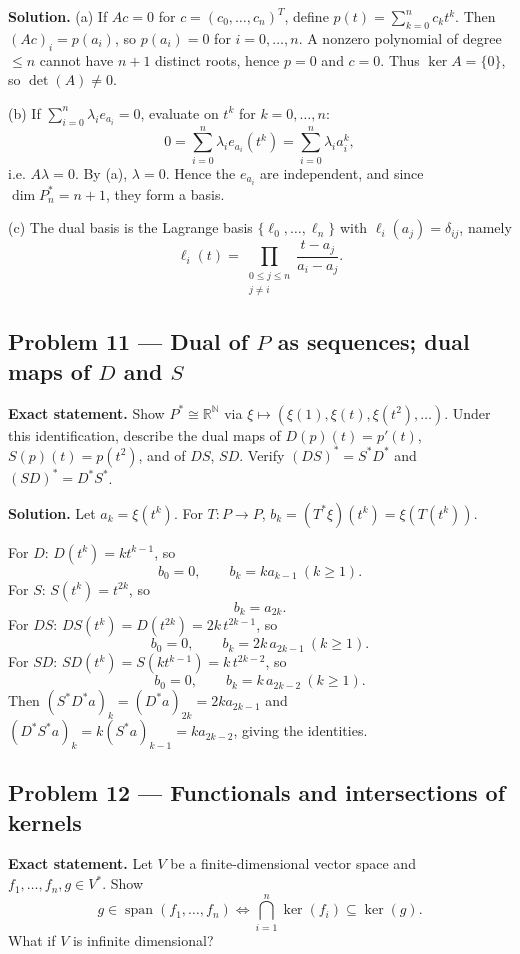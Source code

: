 \documentclass[12pt,a4paper]{article}
\theoremstyle{plain}
\theoremstyle{definition}      %
\begin{document}
\textbf{Solution.}
(a) If \(Ac=0\) for \(c=(c_0,\dots,c_n)^T\), define \(p(t)=\sum_{k=0}^n c_k t^k\). Then \((Ac)_i=p(a_i)\), so \(p(a_i)=0\) for
\(i=0,\dots,n\). A nonzero polynomial of degree \(\le n\) cannot have \(n+1\) distinct roots, hence \(p=0\) and \(c=0\).
Thus \(\ker A=\{0\}\), so \(\det(A)\neq0\).

(b) If \(\sum_{i=0}^n \lambda_i e_{a_i}=0\), evaluate on \(t^k\) for \(k=0,\dots,n\):
\[
0=\sum_{i=0}^n \lambda_i e_{a_i}(t^k)=\sum_{i=0}^n \lambda_i a_i^k,
\]
i.e. \(A\lambda=0\). By (a), \(\lambda=0\). Hence the \(e_{a_i}\) are independent, and since \(\dim P_n^*=n+1\), they form a basis.

(c) The dual basis is the Lagrange basis \(\{\ell_0,\dots,\ell_n\}\) with \(\ell_i(a_j)=\delta_{ij}\), namely
\[
\ell_i(t)=\prod_{\substack{0\le j\le n\\ j\ne i}}\frac{t-a_j}{a_i-a_j}.
\]

\subsection*{Problem 11 — Dual of \(P\) as sequences; dual maps of \(D\) and \(S\)}

\textbf{Exact statement.}
Show \(P^*\cong\mathbb R^{\mathbb N}\) via \(\xi\mapsto (\xi(1),\xi(t),\xi(t^2),\dots)\).
Under this identification, describe the dual maps of
\(D(p)(t)=p'(t)\), \(S(p)(t)=p(t^2)\), and of \(DS\), \(SD\).
Verify \((DS)^*=S^*D^*\) and \((SD)^*=D^*S^*\).

\textbf{Solution.}
Let \(a_k=\xi(t^k)\). For \(T:P\to P\), \(b_k=(T^*\xi)(t^k)=\xi(T(t^k))\).

For \(D\): \(D(t^k)=k t^{k-1}\), so
\[
b_0=0,\qquad b_k=k a_{k-1}\ (k\ge1).
\]
For \(S\): \(S(t^k)=t^{2k}\), so
\[
b_k=a_{2k}.
\]
For \(DS\): \(DS(t^k)=D(t^{2k})=2k\,t^{2k-1}\), so
\[
b_0=0,\qquad b_k=2k\,a_{2k-1}\ (k\ge1).
\]
For \(SD\): \(SD(t^k)=S(k t^{k-1})=k\,t^{2k-2}\), so
\[
b_0=0,\qquad b_k=k\,a_{2k-2}\ (k\ge1).
\]
Then \((S^*D^*a)_k=(D^*a)_{2k}=2k a_{2k-1}\) and \((D^*S^*a)_k=k(S^*a)_{k-1}=k a_{2k-2}\), giving the identities.

\subsection*{Problem 12 — Functionals and intersections of kernels}

\textbf{Exact statement.}
Let \(V\) be a finite-dimensional vector space and \(f_1,\dots,f_n,g\in V^*\).
Show
\[
g\in \operatorname{span}(f_1,\dots,f_n)
\iff
\bigcap_{i=1}^n \ker(f_i)\subseteq \ker(g).
\]
What if \(V\) is infinite dimensional?
\end{document}
